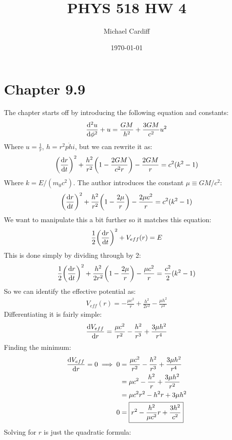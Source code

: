 \documentclass[12pt]{article}
\title{\vspace{-3em}PHYS 518 HW 4}
\author{Michael Cardiff}
\date{\today}
\begin{document}
\maketitle

\section{Chapter 9.9}
The chapter starts off by introducing the following equation and constants:
\begin{align*}
  \dv[2]{u}{\phi}+u=\frac{GM}{h^2}+\frac{3GM}{c^2}u^2
\end{align*}
Where $u=\frac{1}{r}$, $h=r^2\dot{phi}$, but we can rewrite it as:
\begin{align*}
  \qty(\dv{r}{t})^2+\frac{h^2}{r^2}\qty(1-\frac{2GM}{c^2r})-\frac{2GM}{r}=
  c^2(k^2-1)
\end{align*}
Where $k=E/(m_0c^2)$. The author introduces the constant $\mu\equiv GM/c^2$:
\begin{align*}
  \qty(\dv{r}{t})^2+\frac{h^2}{r^2}\qty(1-\frac{2\mu}{r})-\frac{2\mu c^2}{r}=
  c^2(k^2-1)
\end{align*}
We want to manipulate this a bit further so it matches this equation:
\begin{align*}
  \frac{1}{2}\qty(\dv{r}{t})^2+V_{eff}(r)=E
\end{align*}
This is done simply by dividing through by 2:
\begin{align*}
  \frac{1}{2}\qty(\dv{r}{t})^2
  +\frac{h^2}{2r^2}\qty(1-\frac{2\mu}{r})
  -\frac{\mu c^2}{r}=\frac{c^2}{2}(k^2-1)
\end{align*}
So we can identify the effective potential as:
\begin{align*}
  V_{eff}(r)=-\frac{\mu c^2}{r}+\frac{h^2}{2r^2}-\frac{\mu h^2}{r^3}
\end{align*}
Differentiating it is fairly simple:
\begin{align*}
  \dv{V_{eff}}{r}=\frac{\mu c^2}{r^2}-\frac{h^2}{r^3}+\frac{3\mu h^2}{r^4}
\end{align*}
Finding the minimum:
\begin{align*}
  \dv{V_{eff}}{r}=0\implies
  0&=\frac{\mu c^2}{r^2}-\frac{h^2}{r^3}+\frac{3\mu h^2}{r^4}\\
  &=\mu c^2-\frac{h^2}{r}+\frac{3\mu h^2}{r^2}\\
  &=\mu c^2r^2-h^2r+3\mu h^2\\
  0&=\boxed{r^2-\frac{h^2}{\mu c^2}r+\frac{3h^2}{c^2}}
\end{align*}
Solving for $r$ is just the quadratic formula:
\end{document}
